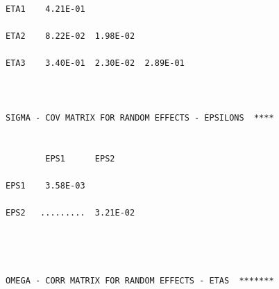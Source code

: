 \documentclass[
  10pt,
]{krantz}
\begin{document}
\begin{verbatim}
ETA1    4.21E-01                                                                                       
                                                                                                       
ETA2    8.22E-02  1.98E-02                                                                             
                                                                                                       
ETA3    3.40E-01  2.30E-02  2.89E-01                                                                   
                                                                                                       
                                                                                                       
                                                                                                       
SIGMA - COV MATRIX FOR RANDOM EFFECTS - EPSILONS  ****                                                 
                                                                                                       
                                                                                                       
        EPS1      EPS2                                                                                 
                                                                                                       
EPS1    3.58E-03                                                                                       
                                                                                                       
EPS2   .........  3.21E-02                                                                             
                                                                                                       
                                                                                                       
                                                                                                       
                                                                                                       
OMEGA - CORR MATRIX FOR RANDOM EFFECTS - ETAS  *******                                                 
                                                                                                       

\end{verbatim}
\end{document}
